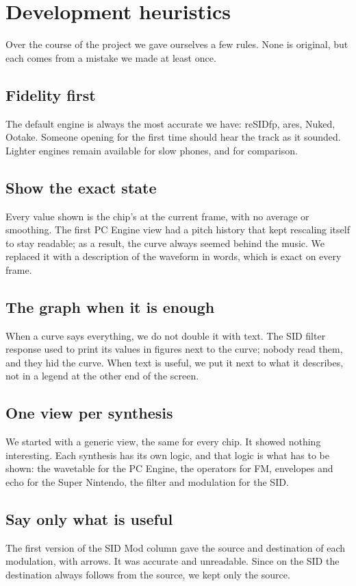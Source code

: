 \chapter{Development heuristics}

Over the course of the project we gave ourselves a few rules. None is original, but each comes from a mistake we made
at least once.

\section{Fidelity first}
The default engine is always the most accurate we have: reSIDfp, ares, Nuked, Ootake. Someone opening \soft for the
first time should hear the track as it sounded. Lighter engines remain available for slow phones, and for comparison.

\section{Show the exact state}
Every value shown is the chip's at the current frame, with no average or smoothing. The first PC Engine view had a
pitch history that kept rescaling itself to stay readable; as a result, the curve always seemed behind the music. We
replaced it with a description of the waveform in words, which is exact on every frame.

\section{The graph when it is enough}
When a curve says everything, we do not double it with text. The SID filter response used to print its values in
figures next to the curve; nobody read them, and they hid the curve. When text is useful, we put it next to what it
describes, not in a legend at the other end of the screen.

\section{One view per synthesis}
We started with a generic view, the same for every chip. It showed nothing interesting. Each synthesis has its own
logic, and that logic is what has to be shown: the wavetable for the PC Engine, the operators for FM, envelopes and
echo for the Super Nintendo, the filter and modulation for the SID.

\section{Say only what is useful}
The first version of the SID Mod column gave the source and destination of each modulation, with arrows. It was
accurate and unreadable. Since on the SID the destination always follows from the source, we kept only the source.

